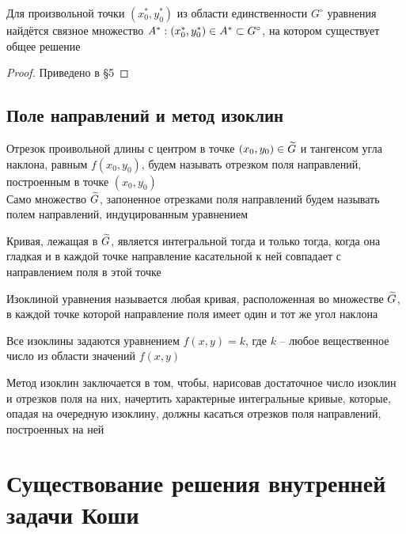 \begin{theorem}\label{th:comm:exist}
    Для произвольной точки $ (x_0^*, y_0^*) $ из области единственности $ G^\circ $ уравнения  найдётся связное множество $ A^* : (x_0^*, y_0^*) \in A^* \subset G^\circ $, на котором существует общее решение
\end{theorem}

\begin{proof}
	Приведено в \S5
\end{proof}

\subsection{Поле направлений и метод изоклин}

\begin{definition}
    Отрезок проивольной длины с центром в точке $ (x_0, y_0) \in \widetilde{G} $ и тангенсом угла наклона, равным $ f(x_0, y_0) $, будем называть отрезком поля направлений, построенным в точке $ (x_0, y_0) $ \\
    Само множество $ \widetilde{G} $, запоненное отрезками поля направлений будем называть полем направлений, индуцированным уравнением 
\end{definition}

Кривая, лежащая в $ \widetilde{G} $, является интегральной тогда и только тогда, когда она гладкая и в каждой точке направление касательной к ней совпадает с направлением поля в этой точке

\begin{definition}
    Изоклиной уравнения  называется любая кривая, расположенная во множестве $ \widetilde{G} $, в каждой точке которой направление поля имеет один и тот же угол наклона
\end{definition}

\begin{remark}
	Все изоклины задаются уравнением $ f(x, y) = k $, где $ k $ -- любое вещественное число из области значений $ f(x, y) $
\end{remark}

Метод изоклин заключается в том, чтобы, нарисовав достаточное число изоклин и отрезков поля на них, начертить характерные интегральные кривые, которые, опадая на очередную изоклину, должны касаться отрезков поля направлений, построенных на ней

\section{Существование решения внутренней задачи Коши}

